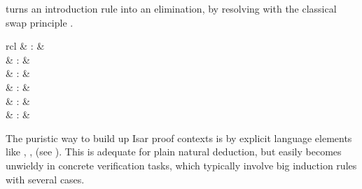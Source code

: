 \begin{isabellebody}
\begin{isamarkuptext}
  \begin{descr}

  \item [\mbox{\isa{swapped}}] turns an introduction rule into an
  elimination, by resolving with the classical swap principle .

  \end{descr}%
\end{isamarkuptext}%
\isamarkuptrue%
%
\isamarkuptrue%
%
\isamarkuptrue%
%
\begin{isamarkuptext}%
\begin{matharray}{rcl}
    \mbox{} & : &  \\
    \mbox{}\isa{{\isachardoublequote}\isactrlsup {\isacharasterisk}{\isachardoublequote}} & : &  \\
    \mbox{} & : & \isaratt \\
    \mbox{} & : & \isaratt \\
    \mbox{} & : & \isaratt \\
    \mbox{} & : & \isaratt \\
  \end{matharray}

  The puristic way to build up Isar proof contexts is by explicit
  language elements like \mbox{}, \mbox{},
  \mbox{} (see ).  This is adequate
  for plain natural deduction, but easily becomes unwieldy in concrete
  verification tasks, which typically involve big induction rules with
  several cases.


\end{isamarkuptext}
\end{isabellebody}
